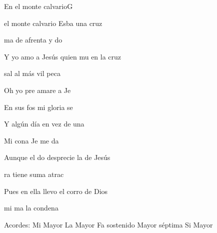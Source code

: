 \documentclass[12pt, spanish]{book}
\begin{document}
\begin{song}{En el monte calvario}{G}
\begin{SBExtraKeys}
{            \begin{SBOpGroup}
                 el monte calvario Esba una cruz

                ma de afrenta y do

                Y yo amo a Jesús quien mu en la cruz

                 sal al más vil peca
            \end{SBOpGroup}

            \begin{SBChorus}
                Oh yo pre amare a Je

                En sus fos mi gloria se

                Y algún día en vez de una 

                Mi cona Je me da
            \end{SBChorus}

            \begin{SBOpGroup}
                Aunque el do desprecie la  de Jesús

                ra  tiene suma atrac

                Pues en ella llevo el corro de Dios

                 mi ma la condena
            \end{SBOpGroup}

            \ifChordBk
            \begin{SBOpGroup}
                Acordes:\break
                \upchord{\E}\qquad Mi Mayor \hfill
                \upchord{\A}\qquad La Mayor \hfill\null\break
                \upchord{\Fsseven}Fa sostenido Mayor s\'eptima \hfill
                \upchord{\B}Si Mayor \hfill\null\break
            \end{SBOpGroup}
            \fi
        }\end{SBExtraKeys}
    \end{song}
\end{document}
